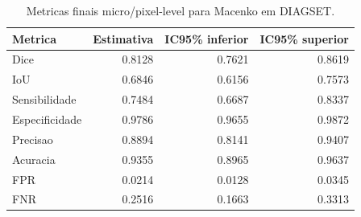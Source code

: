 \begin{table}[!htb]
\centering
\caption{Metricas finais micro/pixel-level para Macenko em DIAGSET.}
\label{tab:results_diagset-micro-macenko}
\small
\begin{tabular}{lrrr}
\toprule
Metrica & Estimativa & IC95\% inferior & IC95\% superior \\
\midrule
Dice & 0.8128 & 0.7621 & 0.8619 \\
IoU & 0.6846 & 0.6156 & 0.7573 \\
Sensibilidade & 0.7484 & 0.6687 & 0.8337 \\
Especificidade & 0.9786 & 0.9655 & 0.9872 \\
Precisao & 0.8894 & 0.8141 & 0.9407 \\
Acuracia & 0.9355 & 0.8965 & 0.9637 \\
FPR & 0.0214 & 0.0128 & 0.0345 \\
FNR & 0.2516 & 0.1663 & 0.3313 \\
\bottomrule
\end{tabular}
\end{table}
